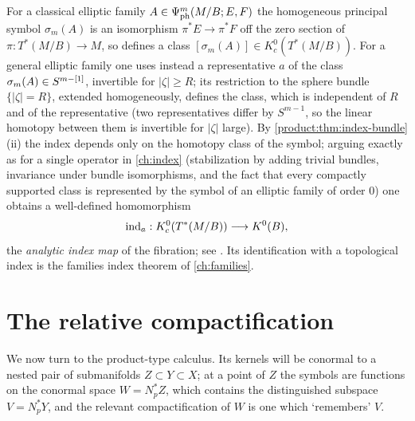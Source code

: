 \begin{remark}\label{product:rem:K-index}
For a classical elliptic family $A\in\Psi^{m}_{\mathrm{ph}}(M/B;E,F)$ the
homogeneous principal symbol $\sigma_m(A)$ is an isomorphism
$\pi^*E\longrightarrow\pi^*F$ off the zero section of
$\pi:T^*(M/B)\longrightarrow M$, so defines a class $[\sigma_m(A)]\in
K^0_c(T^*(M/B))$. For a general elliptic family one uses instead a representative
$a$ of the class $\sigma_m(A)\in S^{m-[1]}$, invertible for $|\zeta|\ge R$; its
restriction to the sphere bundle $\{|\zeta|=R\}$, extended homogeneously, defines
the class, which is independent of $R$ and of the representative (two
representatives differ by $S^{m-1}$, so the linear homotopy between them is
invertible for $|\zeta|$ large). By \cref{product:thm:index-bundle}(ii) the index depends
only on the homotopy class of the symbol; arguing exactly as for a single
operator in \cref{ch:index} (stabilization by adding trivial bundles,
invariance under bundle isomorphisms, and the fact that every compactly supported
class is represented by the symbol of an elliptic family of order $0$) one
obtains a well-defined homomorphism
\begin{equation*}
\operatorname{ind}_a:K^0_c(T^*(M/B))\longrightarrow K^0(B),
\end{equation*}
the \emph{analytic index map} of the fibration; see \cite{Atiyah-Singer-IV}. Its
identification with a topological index is the families index theorem of
\cref{ch:families}.
\end{remark}

\section{The relative compactification}\label{product:sec:relative}

We now turn to the product-type calculus. Its kernels will be conormal to a
nested pair of submanifolds $Z\subset Y\subset X$; at a point of $Z$ the
symbols are functions on the conormal space $W=N^*_pZ$, which contains the
distinguished subspace $V=N^*_pY$, and the relevant compactification of $W$ is
one which `remembers' $V$.

